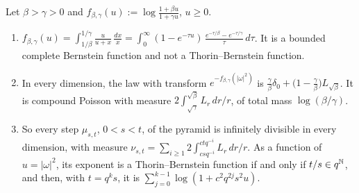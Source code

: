 \begin{proposition}
\label{prop:matern-increments}

Let $\beta > \gamma > 0$ and $f_{\beta,\gamma}(u) := \log\frac{1 + \beta u}{1 + \gamma u}$, $u \ge 0$.
\begin{enumerate}
\item $f_{\beta,\gamma}(u) = \int_{1/\beta}^{1/\gamma}\frac{u}{u + x}\,\frac{dx}{x}
= \int_0^\infty(1 - e^{-\tau u})\,\frac{e^{-\tau/\beta} - e^{-\tau/\gamma}}{\tau}\,d\tau$. It is a
bounded complete Bernstein function and not a Thorin--Bernstein function.
\item In every dimension, the law with transform $e^{-f_{\beta,\gamma}(|\omega|^2)}$ is
$\frac\gamma\beta\delta_0 + \bigl(1 - \frac\gamma\beta\bigr)L_{\sqrt\beta}$. It is compound Poisson with
\Levy{} measure $2\int_{\sqrt\gamma}^{\sqrt\beta}L_r\,dr/r$, of total mass $\log(\beta/\gamma)$.
\item So every step $\mu_{s,t}$, $0 < s < t$, of the \Matern{} pyramid is infinitely divisible in
every dimension, with \Levy{} measure
$\nu_{s,t} = \sum_{i \ge 1}2\int_{csq^{-i}}^{ctq^{-i}}L_r\,dr/r$. As a function of $u = |\omega|^2$,
its exponent is a Thorin--Bernstein function if and only if $t/s \in q^{\mathbb{N}}$, and then, with
$t = q^ks$, it is $\sum_{j=0}^{k-1}\log(1 + c^2q^{2j}s^2u)$.
\end{enumerate}
\end{proposition}

